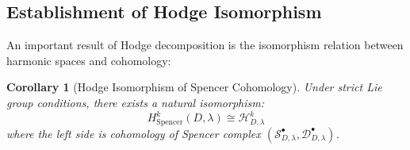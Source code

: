 \documentclass[a4paper,12pt]{extarticle}
\newtheorem{corollary}[theorem]{Corollary}
\theoremstyle{definition}
\begin{document}
\subsection{Establishment of Hodge Isomorphism}

An important result of Hodge decomposition is the isomorphism relation between harmonic spaces and cohomology:

\begin{corollary}[Hodge Isomorphism of Spencer Cohomology]
Under strict Lie group conditions, there exists a natural isomorphism:
\begin{equation}\label{eq:alg-hodge-iso}
H^k_{\text{Spencer}}(D,\lambda) \cong \mathcal{H}^k_{D,\lambda}
\end{equation}
where the left side is cohomology of Spencer complex $(\mathcal{S}^{\bullet}_{D,\lambda}, \mathcal{D}^{\bullet}_{D,\lambda})$.
\end{corollary}
\end{document}
